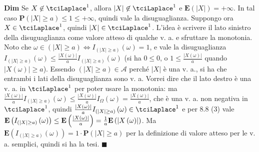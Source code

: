 \documentclass{article}
\begin{document}
\textbf{Dim} Se $X\not\in \tciLaplace ^{1}$, allora $\left\vert X\right\vert
\not\in \tciLaplace ^{1}$ e $\mathbf{E}\left( \left\vert X\right\vert
\right) =+\infty $. In tal caso $\mathbf{P}\left( \left\vert X\right\vert
\geq a\right) \leq 1\leq +\infty $, quindi vale la disuguaglianza. Suppongo
ora $X\in \tciLaplace ^{1}$, quindi $\left\vert X\right\vert \in \tciLaplace
^{1}$. L'idea \`{e} scrivere il lato sinistro della disuguaglianza come
valore atteso di qualche v. a. e sfruttare la monotonia. Noto che $\omega
\in \left( \left\vert X\right\vert \geq a\right) \Longleftrightarrow
I_{\left( \left\vert X\right\vert \geq a\right) }\left( \omega \right) =1$,
e vale la disuguaglianza $I_{\left( \left\vert X\right\vert \geq a\right)
}\left( \omega \right) \leq \frac{\left\vert X\left( \omega \right)
\right\vert }{a}I_{\left( \left\vert X\right\vert \geq a\right) }\left(
\omega \right) $ (si ha $0\leq 0$, o $1\leq \frac{\left\vert X\left( \omega
\right) \right\vert }{a}$ quando $\left\vert X\left( \omega \right)
\right\vert \geq a$). Essendo $\left( \left\vert X\right\vert \geq a\right)
\in \mathcal{A}$ perch\'{e} $\left\vert X\right\vert $ \`{e} una v. a., si
ha che entrambi i lati della disuguaglianza sono v. a. Vorrei dire che il
lato destro \`{e} una v. a. in $\tciLaplace ^{1}$ per poter usare la
monotonia: ma $\frac{\left\vert X\left( \omega \right) \right\vert }{a}%
I_{\left( \left\vert X\right\vert \geq a\right) }\left( \omega \right) \leq 
\frac{\left\vert X\left( \omega \right) \right\vert }{a}I_{\Omega }\left(
\omega \right) =\frac{\left\vert X\left( \omega \right) \right\vert }{a}$,
che \`{e} una v. a. non negativa in $\tciLaplace ^{1}$, quindi $\frac{%
\left\vert X\left( \omega \right) \right\vert }{a}I_{\left( \left\vert
X\right\vert \geq a\right) }\left( \omega \right) \in \tciLaplace ^{1}$ e
per 8.8 (3) vale $\mathbf{E}\left( I_{\left( \left\vert X\right\vert \geq
a\right) }\left( \omega \right) \right) \leq \mathbf{E}\left( \frac{%
\left\vert X\left( \omega \right) \right\vert }{a}\right) =\frac{1}{a}%
\mathbf{E}\left( \left\vert X\left( \omega \right) \right\vert \right) $. Ma 
$\mathbf{E}\left( I_{\left( \left\vert X\right\vert \geq a\right) }\left(
\omega \right) \right) =1\cdot \mathbf{P}\left( \left\vert X\right\vert \geq
a\right) $ per la definizione di valore atteso per le v. a. semplici, quindi
si ha la tesi. $\blacksquare $
\end{document}
